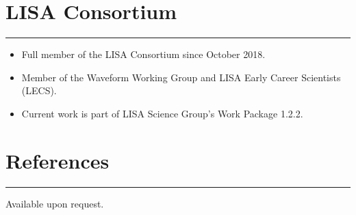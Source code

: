 \documentclass[10.5pt, oneside]{article}   	%
\begin{document}
\newpage

{\color{Sectioncolour}
\section*{LISA Consortium}
\vspace{-3mm}
\noindent\rule{\linewidth}{0.6pt}}
\begin{itemize}
\item Full member of the LISA Consortium since October 2018.
\item Member of the Waveform Working Group and LISA Early Career Scientists (LECS).
\item Current work is part of LISA Science Group's Work Package 1.2.2.
\end{itemize} 

{\color{Sectioncolour}
\section*{References}
\vspace{-3mm}
\noindent\rule{\linewidth}{0.6pt}}
Available upon request.
\end{document}
